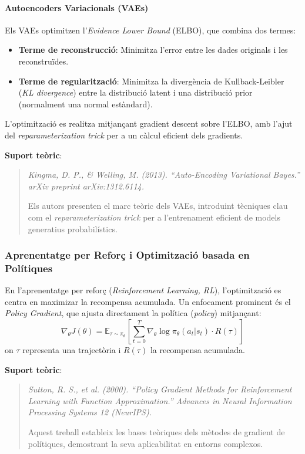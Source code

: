 \paragraph{Autoencoders Variacionals (VAEs)}
Els VAEs optimitzen l'\textit{Evidence Lower Bound} (ELBO), que combina dos termes:

\begin{itemize}
\item \textbf{Terme de reconstrucció}: Minimitza l'error entre les dades originals i les reconstruïdes.

\item \textbf{Terme de regularització}: Minimitza la divergència de Kullback-Leibler (\textit{KL divergence}) entre la distribució latent i una distribució prior (normalment una normal estàndard).
\end{itemize}

L'optimització es realitza mitjançant gradient descent sobre l'ELBO, amb l'ajut del \textit{reparameterization trick} per a un càlcul eficient dels gradients.

\textbf{Suport teòric}:
\begin{quote}
\textit{Kingma, D. P., \& Welling, M. (2013). ``Auto-Encoding Variational Bayes.'' arXiv preprint arXiv:1312.6114.}

Els autors presenten el marc teòric dels VAEs, introduint tècniques clau com el \textit{reparameterization trick} per a l'entrenament eficient de models generatius probabilístics.
\end{quote}

\subsubsection{Aprenentatge per Reforç i Optimització basada en Polítiques}
En l'aprenentatge per reforç (\textit{Reinforcement Learning, RL}), l'optimització es centra en maximizar la recompensa acumulada. Un enfocament prominent és el \textit{Policy Gradient}, que ajusta directament la política (\textit{policy}) mitjançant:
\[ \nabla_\theta J(\theta) = \mathbb{E}_{\tau \sim \pi_\theta} \left[ \sum_{t=0}^T \nabla_\theta \log \pi_\theta(a_t|s_t) \cdot R(\tau) \right] \]
on $\tau$ representa una trajectòria i $R(\tau)$ la recompensa acumulada.

\textbf{Suport teòric}:
\begin{quote}
\textit{Sutton, R. S., et al. (2000). ``Policy Gradient Methods for Reinforcement Learning with Function Approximation.'' Advances in Neural Information Processing Systems 12 (NeurIPS).}

Aquest treball estableix les bases teòriques dels mètodes de gradient de polítiques, demostrant la seva aplicabilitat en entorns complexos.
\end{quote}

